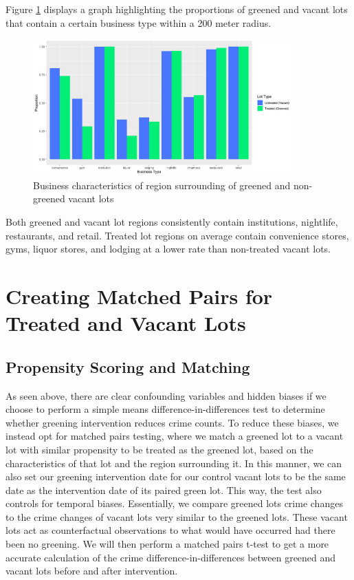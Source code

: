 \documentclass{article}
\begin{document}
\begin{enumerate}
    Figure \ref{fig:figure9} displays a graph highlighting the proportions of greened and vacant lots that contain a certain business type within a 200 meter radius.
    \begin{figure}[h]
    \includegraphics[width=10cm]{imgs/chart_bus_vib.jpg}
    \centering
    \caption{Business characteristics of region surrounding of greened and non-greened vacant lots}
    \label{fig:figure9}
    \end{figure}
    Both greened and vacant lot regions consistently contain institutions, nightlife, restaurants, and retail. Treated lot regions on average contain convenience stores, gyms, liquor stores, and lodging at a lower rate than non-treated vacant lots.
\end{enumerate}
\section{Creating Matched Pairs for Treated and Vacant Lots}
\subsection{Propensity Scoring and Matching}
As seen above, there are clear confounding variables and hidden biases if we choose to perform a simple means difference-in-differences test to determine whether greening intervention reduces crime counts. To reduce these biases, we instead opt for matched pairs testing, where we match a greened lot to a vacant lot with similar propensity to be treated as the greened lot, based on the characteristics of that lot and the region surrounding it. In this manner, we can also set our greening intervention date for our control vacant lots to be the same date as the intervention date of its paired green lot. This way, the test also controls for temporal biases. Essentially, we compare greened lots crime changes to the crime changes of vacant lots very similar to the greened lots. These vacant lots act as counterfactual observations to what would have occurred had there been no greening. We will then perform a matched pairs t-test to get a more accurate calculation of the crime difference-in-differences between greened and vacant lots before and after intervention. 
\end{document}
